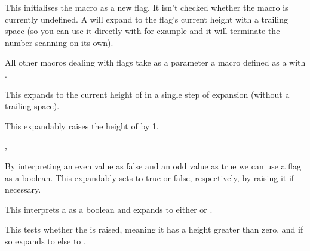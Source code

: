 \begin{function}{\ekvcFlagNew}
  \begin{syntax}
  \end{syntax}
  This initialises the macro  as a new flag. It isn't checked whether
  the macro  is currently undefined. A  will expand to the
  flag's current height with a trailing space (so you can use it directly with
   for example and it will terminate the number scanning on
  its own).

  All other macros dealing with flags take as a parameter a macro defined as a
   with .
\end{function}

\begin{function}{\ekvcFlagHeight}
  \begin{syntax}
  \end{syntax}
  This expands to the current height of  in a single step of
  expansion (without a trailing space).
\end{function}

\begin{function}{\ekvcFlagRaise}
  \begin{syntax}
  \end{syntax}
  This expandably raises the height of  by 1.
\end{function}

\begin{function}{\ekvcFlagSetTrue,\ekvcFlagSetFalse}
  \begin{syntax}
  \end{syntax}
  By interpreting an even value as false and an odd value as true we can use a
  flag as a boolean. This expandably sets  to true or false,
  respectively, by raising it if necessary.
\end{function}

\begin{function}{\ekvcFlagIf}
  \begin{syntax}
  \end{syntax}
  This interprets a  as a boolean and expands to either 
  or .
\end{function}

\begin{function}{\ekvcFlagIfRaised}
  \begin{syntax}
  \end{syntax}
  This tests whether the  is raised, meaning it has a height greater
  than zero, and if so expands to  else to .
\end{function}

